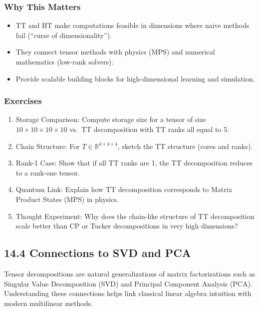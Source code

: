 \documentclass[
  letterpaper,
  DIV=11,
  numbers=noendperiod]{scrreprt}
\providecommand{\tightlist}{%
  \setlength{\itemsep}{0pt}\setlength{\parskip}{0pt}}
\begin{document}
\subsubsection{Why This Matters}\label{why-this-matters-37}

\begin{itemize}
\tightlist
\item
  TT and HT make computations feasible in dimensions where naive methods
  fail (``curse of dimensionality'').
\item
  They connect tensor methods with physics (MPS) and numerical
  mathematics (low-rank solvers).
\item
  Provide scalable building blocks for high-dimensional learning and
  simulation.
\end{itemize}

\subsubsection{Exercises}\label{exercises-51}

\begin{enumerate}
\def\labelenumi{\arabic{enumi}.}
\item
  Storage Comparison: Compute storage size for a tensor of size
  \(10 \times 10 \times 10 \times 10\) vs.~TT decomposition with TT
  ranks all equal to 5.
\item
  Chain Structure: For \(T \in \mathbb{R}^{4 \times 4 \times 4}\),
  sketch the TT structure (cores and ranks).
\item
  Rank-1 Case: Show that if all TT ranks are 1, the TT decomposition
  reduces to a rank-one tensor.
\item
  Quantum Link: Explain how TT decomposition corresponds to Matrix
  Product States (MPS) in physics.
\item
  Thought Experiment: Why does the chain-like structure of TT
  decomposition scale better than CP or Tucker decompositions in very
  high dimensions?
\end{enumerate}

\subsection{14.4 Connections to SVD and
PCA}\label{connections-to-svd-and-pca}

Tensor decompositions are natural generalizations of matrix
factorizations such as Singular Value Decomposition (SVD) and Principal
Component Analysis (PCA). Understanding these connections helps link
classical linear algebra intuition with modern multilinear methods.
\end{document}
